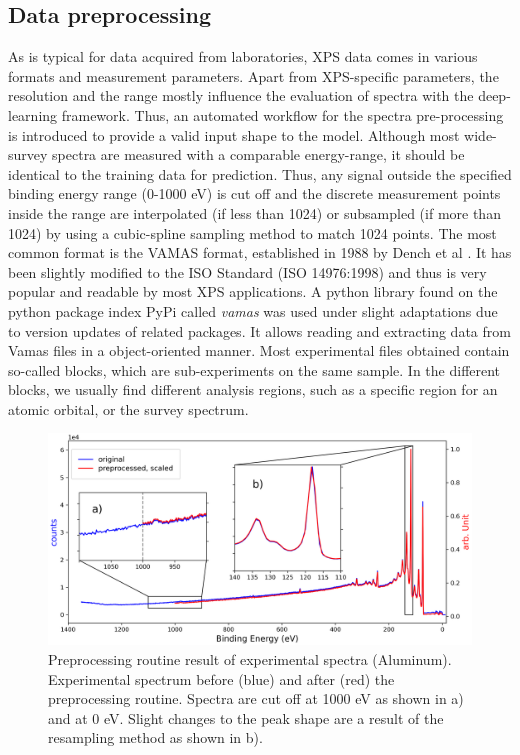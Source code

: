\subsection{Data preprocessing}

As is typical for data acquired from laboratories, XPS data comes in various formats and measurement parameters. Apart from XPS-specific parameters, the resolution and the range mostly influence the evaluation of spectra with the deep-learning framework. Thus, an automated workflow for the spectra pre-processing is introduced to provide a valid input shape to the model.
Although most wide-survey spectra are measured with a comparable energy-range, it should be identical to the training data for prediction. Thus, any signal outside the specified binding energy range (0-1000 eV) is cut off and the discrete measurement points inside the range are interpolated (if less than 1024) or subsampled (if more than 1024) by using a cubic-spline sampling method to match 1024 points. The most common format is the VAMAS format, established in 1988 by Dench et al \cite{dench_vamas_1988}. It has been slightly modified to the ISO Standard \cite{1400-1700_iso_nodate}(ISO 14976:1998) and thus is very popular and readable by most XPS applications. A python library found on the python package index PyPi called \emph{vamas} \cite{krinninger_vamas_nodate} was used under slight adaptations due to version updates of related packages. It allows reading and extracting data from Vamas files in a object-oriented manner.
Most experimental files obtained contain so-called blocks, which are sub-experiments on the same sample. In the different blocks, we usually find different analysis regions, such as a specific region for an atomic orbital, or the survey spectrum.

\begin{figure}
    \centering
    \includegraphics[width=\textwidth]{Figures/preprocessing_routine.png}
    \caption{Preprocessing routine result of experimental spectra (Aluminum). Experimental spectrum before (blue) and after (red) the preprocessing routine. Spectra are cut off at 1000 eV as shown in a) and at 0 eV. Slight changes to the peak shape are a result of the resampling method as shown in b).}
    \label{fig:preproc_routine}
\end{figure}

